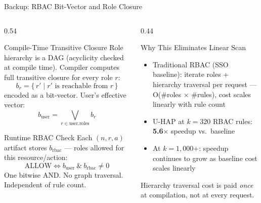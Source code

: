 \documentclass[aspectratio=169,10pt]{beamer}
\newcommand{\tightitems}{%
  \setlength{\topsep}{1pt}%
  \setlength{\itemsep}{2pt}%
  \setlength{\parsep}{0pt}%
  \setlength{\parskip}{0pt}%
}
\begin{document}
\begin{frame}[t,noframenumbering]{Backup: RBAC Bit-Vector and Role Closure}
\vspace{3pt}
\begin{columns}[T,onlytextwidth]
\begin{column}{0.54\textwidth}
\begin{callout}{Compile-Time Transitive Closure}
Role hierarchy is a DAG (acyclicity checked at compile time).
Compiler computes full transitive closure for every role $r$:
\[ b_r = \bigl\{\,r' \mid r' \text{ is reachable from } r\,\bigr\} \]
encoded as a bit-vector. User's effective vector:
\[ b_{\mathrm{user}} = \bigvee_{r \in \mathrm{user.roles}} b_r \]
\end{callout}
\begin{callout}{Runtime RBAC Check}
Each $(n,r,a)$ artifact stores $b_{\mathrm{rbac}}$ --- roles allowed for this resource/action:
\[ \text{ALLOW} \iff b_{\mathrm{user}}\ \&\ b_{\mathrm{rbac}} \neq 0 \]
One bitwise AND. No graph traversal. Independent of rule count.
\end{callout}
\end{column}
\begin{column}{0.44\textwidth}
\begin{callout}{Why This Eliminates Linear Scan}
\begin{itemize}\tightitems
\item Traditional RBAC (SSO baseline): iterate roles + hierarchy traversal per request --- O(\#roles $\times$ \#rules), cost scales linearly with rule count
\item U-HAP at $k{=}320$ RBAC rules: \textbf{5.6$\times$} speedup vs.\ baseline
\item At $k{=}1{,}000$+: speedup continues to grow as baseline cost scales linearly
\end{itemize}
Hierarchy traversal cost is paid \emph{once} at compilation, not at every request.
\end{callout}
\end{column}
\end{columns}
\end{frame}
\end{document}
